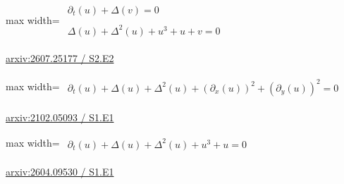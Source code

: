 \documentclass[UTF8,10pt,a4paper,fontset=mac]{ctexart}
\begin{document}
\begin{minipage}{\linewidth}\begin{center}\begin{adjustbox}{max width=\linewidth}$\displaystyle\begin{gathered}\begin{gathered}\partial_{t}(u)+\Delta(v)=0\end{gathered}\\[5pt]\begin{gathered}\Delta(u)+\Delta^{2}(u)+u^{3}+u+v=0\end{gathered}\end{gathered}$\end{adjustbox}\end{center}{\small\href{https://arxiv.org/html/2607.25177#S2.E2}{arxiv:2607.25177 / S2.E2}}\par\end{minipage}\par\vspace{6mm}

\begin{minipage}{\linewidth}\begin{center}\begin{adjustbox}{max width=\linewidth}$\displaystyle\begin{gathered}\begin{gathered}\partial_{t}(u)+\Delta(u)+\Delta^{2}(u)+(\partial_{x}(u))^{2}+(\partial_{y}(u))^{2}=0\end{gathered}\end{gathered}$\end{adjustbox}\end{center}{\small\href{https://arxiv.org/html/2102.05093#S1.E1}{arxiv:2102.05093 / S1.E1}}\par\end{minipage}\par\vspace{6mm}

\begin{minipage}{\linewidth}\begin{center}\begin{adjustbox}{max width=\linewidth}$\displaystyle\begin{gathered}\begin{gathered}\partial_{t}(u)+\Delta(u)+\Delta^{2}(u)+u^{3}+u=0\end{gathered}\end{gathered}$\end{adjustbox}\end{center}{\small\href{https://arxiv.org/html/2604.09530#S1.E1}{arxiv:2604.09530 / S1.E1}}\par\end{minipage}\par\vspace{6mm}
\end{document}
